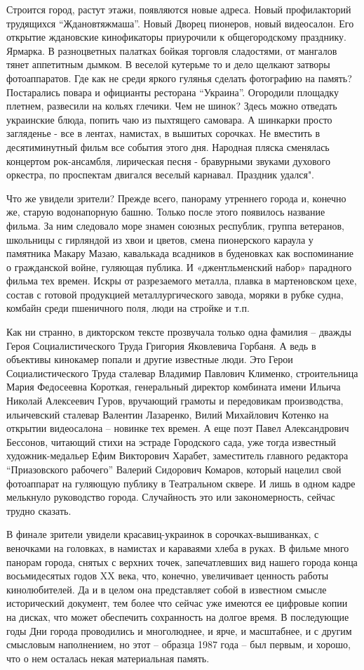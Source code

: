 Строится город, растут этажи, появляются новые адреса. Новый профилакторий
трудящихся \enquote{Ждановтяжмаша}. Новый Дворец пионеров, новый видеосалон. Его
открытие ждановские кинофикаторы  приурочили к общегородскому  праздни­ку.
Ярмарка. В разноцветных палатках бойкая торговля сладостями, от мангалов тянет
аппетитным дымком. В веселой кутерьме то и дело щелкают затворы  фотоаппаратов.
Где как не среди яркого гулянья сделать фотографию на память? Постарались
повара и официанты ресторана \enquote{Украина}. Огородили  площадку плетнем, развесили
на кольях глечики. Чем не шинок? Здесь можно отведать украинские блюда, по­пить
чаю из пыхтящего самовара. А шинкарки просто загляденье - все в лентах,
намистах, в вышитых сорочках. Не вместить в десятиминутный фильм все события
этого дня. Народная пляска сменялась концертом рок-ансамбля, лирическая песня -
бравурными звуками духового оркестра, по проспектам двигался веселый карнавал.
Праздник удался".

Что же увидели зрители? Прежде всего, панораму утреннего города и, конечно же,
старую водонапорную башню. Только после этого появилось название фильма. За ним
следовало море знамен союзных республик, группа ветеранов, школьницы с
гирляндой из хвои и цветов, смена пионерского караула у памятника Макару Мазаю,
кавалькада всадников в буденовках как воспоминание о гражданской войне,
гуляющая публика. И «джентльменский набор» парадного фильма тех времен. Искры
от разрезаемого металла, плавка в мартеновском цехе, состав с готовой
продукцией металлургического завода, моряки в рубке судна, комбайн среди
пшеничного поля, люди на стройке и т.п.

Как ни странно, в дикторском тексте прозвучала только одна фамилия – дважды
Героя Социалистического Труда  Григория Яковлевича Горбаня. А ведь в объективы
кинокамер попали и другие известные люди. Это Герои Социалистического Труда
сталевар Владимир Павлович  Клименко, строительница Мария Федосеевна Короткая,
генеральный директор комбината имени Ильича Николай Алексеевич  Гуров,
вручающий грамоты и передовикам производства, ильичевский сталевар Валентин
Лазаренко,  Вилий Михайлович Котенко на открытии видеосалона – новинке тех
времен. А еще поэт Павел Александрович Бессонов, читающий стихи на эстраде
Городского сада, уже тогда известный художник-медальер Ефим Викторович Харабет,
заместитель главного редактора \enquote{Приазовского рабочего} Валерий Сидорович
Комаров, который нацелил свой фотоаппарат на гуляющую  публику в Театральном
сквере. И лишь в одном кадре мелькнуло руководство города. Случайность это или
закономерность, сейчас трудно сказать.

В финале зрители увидели красавиц-украинок  в сорочках-вышиванках, с веночками
на головках, в намистах и караваями хлеба в руках. В фильме много панорам
города, снятых с верхних точек, запечатлевших вид нашего города конца
восьмидесятых годов XX века, что, конечно, увеличивает ценность работы
кинолюбителей. Да и в целом она представляет собой в известном смысле
исторический документ, тем более что сейчас уже имеются ее цифровые копии на
дисках, что может обеспечить сохранность на долгое время. В последующие годы
Дни города проводились и многолюднее, и ярче, и масштабнее, и с другим
смысловым наполнением, но этот – образца 1987 года – был первым, и хорошо, что
о нем осталась некая материальная память.
